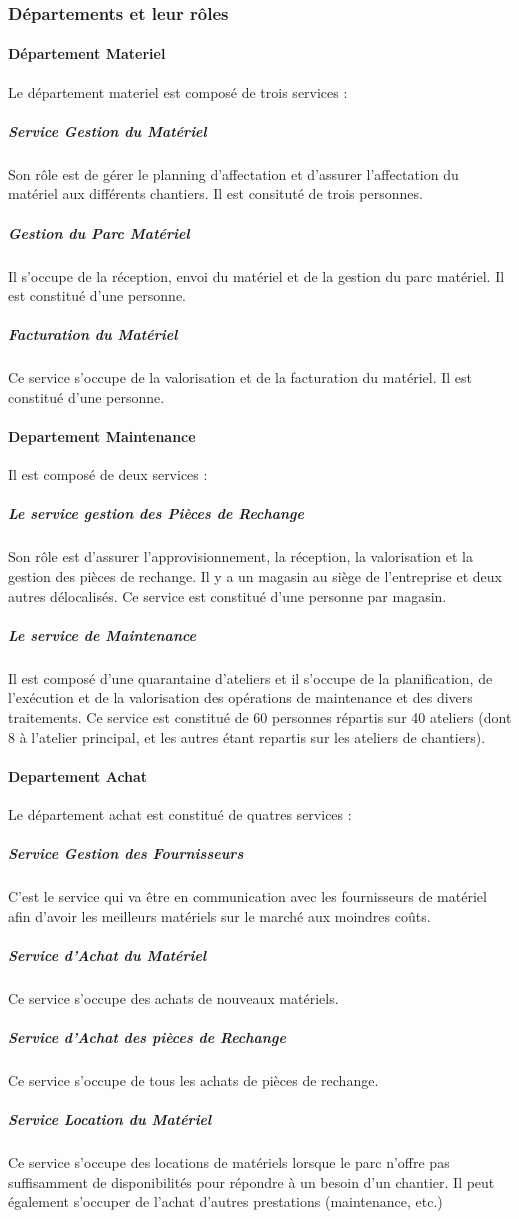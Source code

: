         \subsubsection{Départements et leur rôles}
            \paragraph{Département Materiel}
                Le département materiel est composé de trois services :
                \subparagraph{Service Gestion du Matériel}
                    Son rôle est de gérer le planning d’affectation et d’assurer l’affectation du matériel aux différents chantiers. Il est consituté de trois personnes.
                \subparagraph{Gestion du Parc Matériel}
                    Il s’occupe de la réception, envoi du matériel et de la gestion du parc matériel. Il est constitué d'une personne.
                \subparagraph{Facturation du Matériel}
                    Ce service s’occupe de la valorisation et de la facturation du matériel. Il est constitué d'une personne.        
                
            \paragraph{Departement Maintenance}
                Il est composé de deux services :
                \subparagraph{Le service gestion des Pièces de Rechange}
                    Son rôle est d’assurer l’approvisionnement, la réception, la valorisation et la gestion des pièces   de rechange. Il y a un magasin au siège de l’entreprise et deux autres délocalisés. Ce service est constitué d'une personne par magasin. 
                \subparagraph{Le service de Maintenance}
                    Il est composé d’une quarantaine d’ateliers et il s’occupe de la planification, de l’exécution et de la valorisation des opérations de maintenance et des divers traitements. Ce service est constitué de 60 personnes répartis sur 40 ateliers (dont 8 à l’atelier principal, et les autres étant repartis sur les ateliers de chantiers).

            \paragraph{Departement Achat}
                Le département achat est constitué de quatres services :

                \subparagraph{Service Gestion des Fournisseurs}
	                C'est le service qui va être en communication avec les fournisseurs de matériel afin d'avoir les meilleurs matériels sur le marché aux moindres coûts.
                \subparagraph{Service d’Achat du Matériel}
	                Ce service s'occupe des achats de nouveaux matériels.
                \subparagraph{Service d’Achat des pièces de Rechange}
	                Ce service s'occupe de tous les achats de pièces de rechange.
                \subparagraph{Service Location du Matériel}
	                Ce service s'occupe des locations de matériels lorsque le parc n'offre pas suffisamment de disponibilités pour répondre à un besoin d'un chantier. Il peut également s’occuper de l’achat d’autres prestations (maintenance, etc.)
